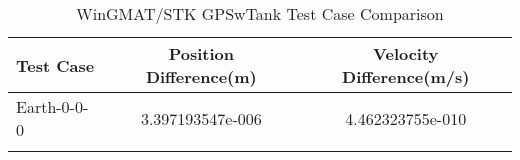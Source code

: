 \begin{table}[htbp!]
\centering
\caption{ WinGMAT/STK GPSwTank Test Case Comparison}
      \begin{tabular}{lcc}
      \hline\hline
          Test Case & Position Difference(m) & Velocity Difference(m/s) \\
         \hline
         Earth-0-0-0 & 3.397193547e-006 & 4.462323755e-010 \\
      \hline\hline
      \label{Table: GPSwTank WinGMAT-STK Table} 
\end{tabular}
\end{table}
